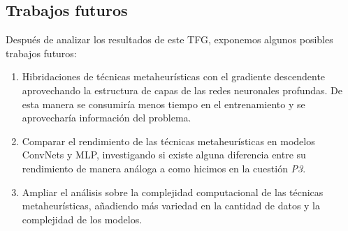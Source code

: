 \subsection{Trabajos futuros}
Después de analizar los resultados de este TFG, exponemos algunos posibles trabajos futuros:

\begin{enumerate}
	\item Hibridaciones de técnicas metaheurísticas con el gradiente descendente aprovechando la estructura de capas de las redes neuronales profundas. De esta manera se consumiría menos tiempo en el entrenamiento y se aprovecharía información del problema.
	
	\item Comparar el rendimiento de las técnicas metaheurísticas en modelos ConvNets y MLP, investigando si existe alguna diferencia entre su rendimiento de manera análoga a como hicimos en la cuestión \textit{P3}.
	
	\item Ampliar el análisis sobre la complejidad computacional de las técnicas metaheurísticas, añadiendo más variedad en la cantidad de datos y la complejidad de los modelos.
\end{enumerate}
